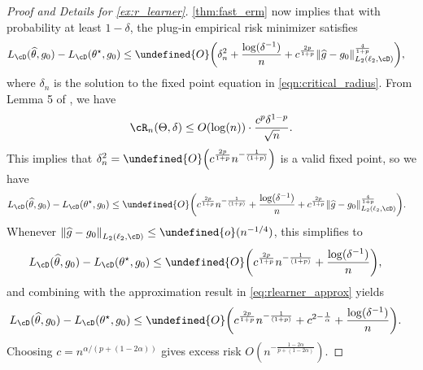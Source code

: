 \documentclass[11pt]{article} %
\newcommand{\pref}[1]{\cref{#1}}
\theoremstyle{theorem}  %
\theoremstyle{plain}
\DeclarePairedDelimiter{\prn}{(}{)}
\DeclarePairedDelimiter{\nrm}{\|}{\|}
\newcommand{\ls}{\ell}
\newcommand{\wt}[1]{\widetilde{#1}}
\newcommand{\wh}[1]{\widehat{#1}}
\let\wt\undefined
\newcommand{\wt}[1]{\widetilde{#1}}
\newcommand{\Ot}{\wt{O}}
\newcommand{\bigoh}{O}
\newcommand{\bigoht}{\Ot}
\newcommand{\poprisk}{L_{\cD}}
\newcommand{\estone}{\wh{g}}
\newcommand{\esttwo}{\wh{\theta}}
\newcommand{\target}{\Theta}
\newcommand{\besttwo}{\theta^{\star}}
\newcommand{\gtone}{g_0}
\begin{document}
\begin{proof}[Proof and Details for \pref{ex:r_learner}]

\pref{thm:fast_erm} now implies that with probability at least $1-\delta$, the plug-in empirical risk minimizer satisfies
%
\begin{align*}
  \poprisk(\esttwo,\gtone) - \poprisk(\besttwo,\gtone)
  &\leq \bigoht\prn*{\delta_n^{2} + \frac{\log(\delta^{-1})}{n} + c^{\frac{2p}{1+p}}\nrm*{\estone-\gtone}_{L_{2}(\ls_2,\cD)}^{\frac{4}{1+p}}},
\end{align*}
%
%
%
%
%
where $\delta_n$ is the solution to the fixed point equation in \pref{eqn:critical_radius}. From Lemma 5 of \cite{nie2017quasi}, we have
\[
\cR_n(\target,\delta)\leq{} \bigoh(\log(n))\cdot{} \frac{c^{p}\delta^{1-p}}{\sqrt{n}}.
\]
This implies that $\delta_n^2 = \bigoht\prn*{c^{\frac{2p}{1+p}}n^{-\frac{1}{(1+p)}}}$ is a valid fixed point, so we have
\begin{align*}
  \poprisk(\esttwo,\gtone) - \poprisk(\besttwo,\gtone)
  &\leq \bigoht\prn*{c^{\frac{2p}{1+p}}n^{-\frac{1}{(1+p)}} + \frac{\log(\delta^{-1})}{n} + c^{\frac{2p}{1+p}}\nrm*{\estone-\gtone}_{L_{2}(\ls_2,\cD)}^{\frac{4}{1+p}}}.
\end{align*}
Whenever $\nrm*{\estone-\gtone}_{L_{2}(\ls_2,\cD)}\leq{}\wt{o}(n^{-1/4})$, this simplifies to
\begin{align*}
  \poprisk(\esttwo,\gtone) - \poprisk(\besttwo,\gtone)
  &\leq \bigoht\prn*{c^{\frac{2p}{1+p}}n^{-\frac{1}{(1+p)}} + \frac{\log(\delta^{-1})}{n}},
\end{align*}
and combining with the approximation result in \pref{eq:rlearner_approx} yields
\begin{align*}
  \poprisk(\esttwo,\gtone) - \poprisk(\besttwo,\gtone)
  &\leq \bigoht\prn*{c^{\frac{2p}{1+p}}n^{-\frac{1}{(1+p)}} + c^{2-\frac{1}{\alpha}} + \frac{\log(\delta^{-1})}{n}}.
\end{align*}
Choosing $c=n^{\alpha/(p+(1-2\alpha))}$ gives excess risk $\bigoh(n^{-\frac{1-2\alpha}{p+(1-2\alpha)}})$.


\end{proof}
\end{document}
